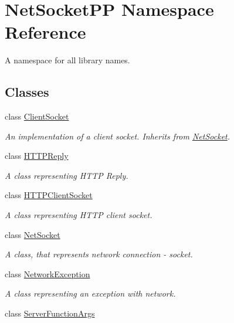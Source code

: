 \hypertarget{namespace_net_socket_p_p}{\section{Net\-Socket\-P\-P Namespace Reference}
\label{namespace_net_socket_p_p}
}


A namespace for all library names.  


\subsection*{Classes}
\begin{DoxyCompactItemize}
\item 
class \hyperlink{class_net_socket_p_p_1_1_client_socket}{Client\-Socket}
\begin{DoxyCompactList}\small\item\em An implementation of a client socket. Inherits from \hyperlink{class_net_socket_p_p_1_1_net_socket}{Net\-Socket}. \end{DoxyCompactList}\item 
class \hyperlink{class_net_socket_p_p_1_1_h_t_t_p_reply}{H\-T\-T\-P\-Reply}
\begin{DoxyCompactList}\small\item\em A class representing H\-T\-T\-P Reply. \end{DoxyCompactList}\item 
class \hyperlink{class_net_socket_p_p_1_1_h_t_t_p_client_socket}{H\-T\-T\-P\-Client\-Socket}
\begin{DoxyCompactList}\small\item\em A class representing H\-T\-T\-P client socket. \end{DoxyCompactList}\item 
class \hyperlink{class_net_socket_p_p_1_1_net_socket}{Net\-Socket}
\begin{DoxyCompactList}\small\item\em A class, that represents network connection -\/ socket. \end{DoxyCompactList}\item 
class \hyperlink{class_net_socket_p_p_1_1_network_exception}{Network\-Exception}
\begin{DoxyCompactList}\small\item\em A class representing an exception with network. \end{DoxyCompactList}\item 
class \hyperlink{class_net_socket_p_p_1_1_server_function_args}{Server\-Function\-Args}

\end{DoxyCompactItemize}

